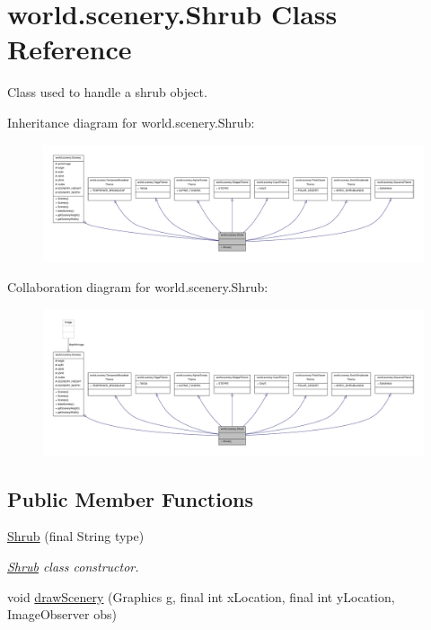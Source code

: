 \hypertarget{a00026}{\section{world.\-scenery.\-Shrub Class Reference}
\label{a00026}
}


Class used to handle a shrub object.  




Inheritance diagram for world.\-scenery.\-Shrub\-:
\nopagebreak
\begin{figure}[H]
\begin{center}
\leavevmode
\includegraphics[width=350pt]{a00182}
\end{center}
\end{figure}


Collaboration diagram for world.\-scenery.\-Shrub\-:
\nopagebreak
\begin{figure}[H]
\begin{center}
\leavevmode
\includegraphics[width=350pt]{a00183}
\end{center}
\end{figure}
\subsection*{Public Member Functions}
\begin{DoxyCompactItemize}
\item 
\hyperlink{a00026_a53967853634ecaaf9bd40f0472a158fd}{Shrub} (final String type)
\begin{DoxyCompactList}\small\item\em \hyperlink{a00026}{Shrub} class constructor. \end{DoxyCompactList}\item 
void \hyperlink{a00024_a626c1ae7fa15d2f96d564c35368fdbc9}{draw\-Scenery} (Graphics g, final int x\-Location, final int y\-Location, Image\-Observer obs)
\end{DoxyCompactItemize}
